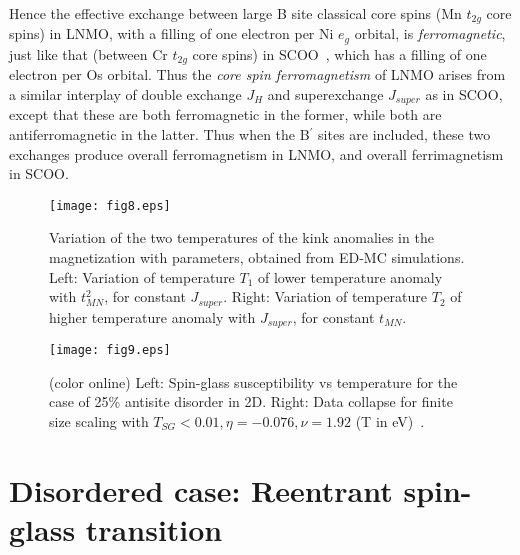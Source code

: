 \documentclass[english,aps,prb,twocolumn,showpacs]{revtex4-1}
\begin{document}
 Hence the effective
 exchange between large B site classical core spins (Mn $t_{2g}$ core spins) in LNMO,
  with a filling of one electron  per Ni $e_{g}$ orbital,
 is {\em ferromagnetic}, just like that (between Cr $t_{2g}$ core spins) in SCOO~\cite{Sr2CrOsO6}, 
 which has a filling of one electron per Os orbital. Thus the {\em core spin ferromagnetism} of LNMO 
 arises from a similar interplay of double exchange
 $J_{H}$  and superexchange $J_{super}$ as in SCOO, except that these are both ferromagnetic in the former,
  while both are antiferromagnetic in the latter. Thus when the B$^{\prime}$ sites are included, these two exchanges
 produce overall ferromagnetism in LNMO, and overall ferrimagnetism in SCOO.  


\begin{figure}
\texttt{[image: fig8.eps]} \\
\caption{Variation of the two temperatures of the kink anomalies in the magnetization with parameters, 
obtained from ED-MC simulations. 
 Left: Variation of temperature $T_{1}$ of lower temperature anomaly with $t_{MN}^{2}$, for constant $J_{super}$.
 Right: Variation of temperature $T_{2}$ of higher temperature anomaly with $J_{super}$, for constant $t_{MN}$.}
\label{T1T2}
\end{figure}
\begin{figure}
\texttt{[image: fig9.eps]} \\
\caption{(color online) Left: Spin-glass susceptibility vs temperature for the case of 25\% antisite
 disorder in 2D. Right: Data collapse for finite size scaling with $T_{SG}<0.01,\eta=-0.076,\nu=1.92$
 (T in eV)~\cite{TSG}.}
\label{spinglass2D} 
\end{figure}
\section{Disordered case: Reentrant spin-glass transition}
\end{document}
